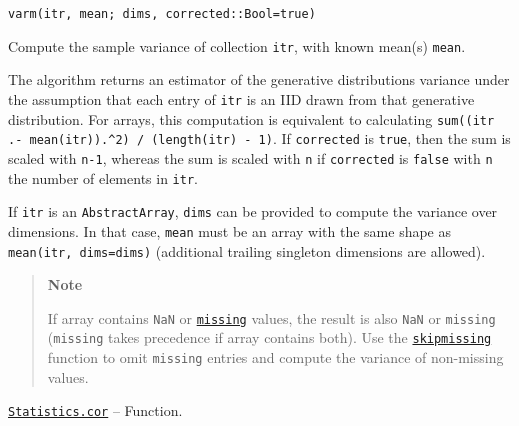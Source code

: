 \begin{adjustwidth}{2em}{0pt}


\begin{verbatim}
varm(itr, mean; dims, corrected::Bool=true)
\end{verbatim}

Compute the sample variance of collection \texttt{itr}, with known mean(s) \texttt{mean}.

The algorithm returns an estimator of the generative distribution{\textquotesingle}s variance under the assumption that each entry of \texttt{itr} is an IID drawn from that generative distribution. For arrays, this computation is equivalent to calculating \texttt{sum((itr .- mean(itr)).{\textasciicircum}2) / (length(itr) - 1)}. If \texttt{corrected} is \texttt{true}, then the sum is scaled with \texttt{n-1}, whereas the sum is scaled with \texttt{n} if \texttt{corrected} is \texttt{false} with \texttt{n} the number of elements in \texttt{itr}.

If \texttt{itr} is an \texttt{AbstractArray}, \texttt{dims} can be provided to compute the variance over dimensions. In that case, \texttt{mean} must be an array with the same shape as \texttt{mean(itr, dims=dims)} (additional trailing singleton dimensions are allowed).

\begin{quote}
\textbf{Note}

If array contains \texttt{NaN} or \hyperlink{14596725676261444434}{\texttt{missing}} values, the result is also \texttt{NaN} or \texttt{missing} (\texttt{missing} takes precedence if array contains both). Use the \hyperlink{2012470681884771400}{\texttt{skipmissing}} function to omit \texttt{missing} entries and compute the variance of non-missing values.

\end{quote}


\end{adjustwidth}
\hypertarget{16231972474237968518}{}
\hyperlink{16231972474237968518}{\texttt{Statistics.cor}}  -- {Function.}

